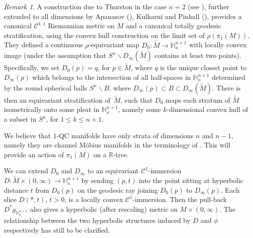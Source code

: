\documentclass[10pt]{amsart}
\let\mathcal\mathscr
\let\moins\smallsetminus
\theoremstyle{definition}
\theoremstyle{remark}
\newtheorem{remark}[theorem]{Remark}
\numberwithin{equation}{section}
\newcommand{\RR}{\mathbb R}
\begin{document}
\begin{remark}
A construction due to Thurston in the case $n=2$ (see \cite{KT}), further extended to all dimensions by
Apanasov (\cite{A}), Kulkarni and Pinkall (\cite{KP}), provides a canonical $\mathcal C^{1,1}$ Riemannian
metric on $M$ and a canonical totally geodesic stratification, using the convex hull construction on the limit set of $\rho(\pi_1(M))$. They defined a continuous
$\rho$-equivariant map $D_0: \widetilde{M}\to \mathbb H^{n+1}_{\kappa}$ with locally convex image (under the assumption that $S^n\moins D_{\infty}(\widetilde{M})$ contains at least two points).
Specifically, we set $D_0(p)=q$, for $p\in \widetilde{M}$, where $q$ is the unique closest point
to $D_{\infty}(p)$ which belongs to the intersection of all half-spaces in $\mathbb H^{n+1}_{\kappa}$
determined by the round spherical balls $S^n\moins B$, where $D_{\infty}(p)\subset B \subset D_{\infty}(\widetilde{M})$.
There is then an equivariant stratification of~$\widetilde{M}$, such that $D_0$ maps each stratum of $\widetilde{M}$
isometrically onto some pleat in $\mathbb H^{n+1}_{\kappa}$, namely some $k$-dimensional
convex hull of a subset in $S^n$, for $1\leq k \leq n+1$.

We believe that $1$-QC manifolds have only strata of dimensions $n$ and $n-1$, namely they are channel
Möbius manifolds in the terminology of \cite{KP}. This will provide an action of $\pi_1(M)$ on a $\RR$-tree.

We can extend $D_0$ and $D_{\infty}$ to an equivariant $\mathcal C^1$-immersion $D:\widetilde{M}\times (0,\infty)\to \mathbb H_{\kappa}^{n+1}$ by sending $(p,t)$ into the point sitting at hyperbolic distance $t$ from $D_0(p)$ on the geodesic ray joining $D_0(p)$ to
$D_{\infty}(p)$. Each slice $D(*, t)$, $t>0$, is a locally convex $\mathcal C^1$-immersion.
Then the pull-back $D^*g_{\mathbb H^{n+1}_{\kappa}}$ also gives a hyperbolic (after rescaling) metric on
$M\times (0,\infty)$. The relationship between the two hyperbolic structures induced by $D$ and $\phi$
respectively has still to be clarified.
\end{remark}
\end{document}
